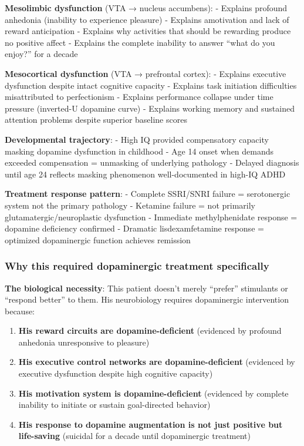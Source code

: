\textbf{Mesolimbic dysfunction} (VTA → nucleus accumbens): - Explains profound anhedonia (inability to experience pleasure) - Explains amotivation and lack of reward anticipation - Explains why activities that should be rewarding produce no positive affect - Explains the complete inability to answer ``what do you enjoy?'' for a decade

\textbf{Mesocortical dysfunction} (VTA → prefrontal cortex): - Explains executive dysfunction despite intact cognitive capacity - Explains task initiation difficulties misattributed to perfectionism - Explains performance collapse under time pressure (inverted-U dopamine curve) - Explains working memory and sustained attention problems despite superior baseline scores

\textbf{Developmental trajectory}: - High IQ provided compensatory capacity masking dopamine dysfunction in childhood - Age 14 onset when demands exceeded compensation = unmasking of underlying pathology - Delayed diagnosis until age 24 reflects masking phenomenon well-documented in high-IQ ADHD

\textbf{Treatment response pattern}: - Complete SSRI/SNRI failure = serotonergic system not the primary pathology - Ketamine failure = not primarily glutamatergic/neuroplastic dysfunction - Immediate methylphenidate response = dopamine deficiency confirmed - Dramatic lisdexamfetamine response = optimized dopaminergic function achieves remission

\subsubsection{Why this required dopaminergic treatment specifically}\label{10a_trd_basis-why-this-required-dopaminergic-treatment-specifically}

\textbf{The biological necessity}: This patient doesn't merely ``prefer'' stimulants or ``respond better'' to them. His neurobiology requires dopaminergic intervention because:

\begin{enumerate}
\def\labelenumi{\arabic{enumi}.}
\tightlist
\item
  \textbf{His reward circuits are dopamine-deficient} (evidenced by profound anhedonia unresponsive to pleasure)
\item
  \textbf{His executive control networks are dopamine-deficient} (evidenced by executive dysfunction despite high cognitive capacity)
\item
  \textbf{His motivation system is dopamine-deficient} (evidenced by complete inability to initiate or sustain goal-directed behavior)
\item
  \textbf{His response to dopamine augmentation is not just positive but life-saving} (suicidal for a decade until dopaminergic treatment)
\end{enumerate}


